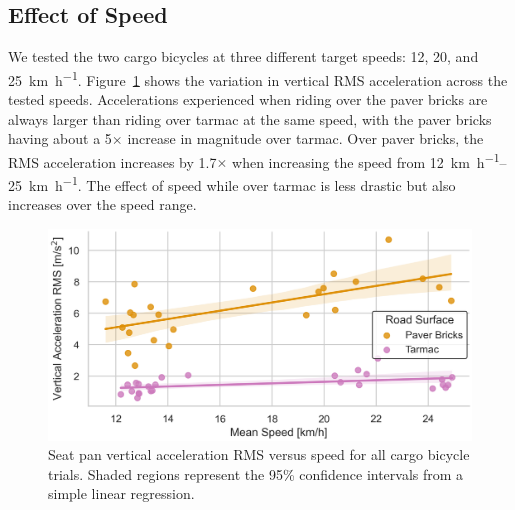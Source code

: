 \documentclass[a4paper]{article}
\begin{document}
\subsection{Effect of Speed}
%
We tested the two cargo bicycles at three different target speeds: 12, 20, and
25~\si{\kilo\meter\per\hour}. Figure~\ref{fig:compare-bicycle-speed} shows the
variation in vertical RMS acceleration across the tested speeds. Accelerations
experienced when riding over the paver bricks are always larger than riding over
tarmac at the same speed, with the paver bricks having about a 5\(\times\)
increase in magnitude over tarmac. Over paver bricks, the RMS acceleration
increases by 1.7\(\times\) when increasing the speed from
\SIrange{12}{25}{\kilo\meter\per\hour}. The effect of speed while over tarmac is
less drastic but also increases over the speed range.
%
\begin{figure}
  \centering
  \includegraphics[width=160mm]{fig/SeatBotacc_ver-bicycle-speed-compare.png}
  \caption{Seat pan vertical acceleration RMS versus speed for all cargo bicycle
  trials. Shaded regions represent the 95\% confidence intervals from a simple
  linear regression.}
  \label{fig:compare-bicycle-speed}
\end{figure}
\end{document}
